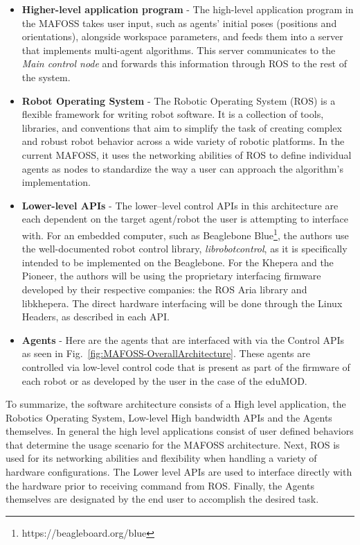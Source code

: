 \begin{itemize}
    \item \textbf{Higher-level application program} - The high-level application program in the MAFOSS takes user input, such as agents' initial poses (positions and orientations), alongside workspace parameters, and feeds them into a server that implements multi-agent algorithms. This server communicates to the \emph{Main control node} and forwards this information through ROS to the rest of the system. 
    \item \textbf{Robot Operating System} - The Robotic Operating System (ROS) is a flexible framework for writing robot software. It is a collection of tools, libraries, and conventions that aim to simplify the task of creating complex and robust robot behavior across a wide variety of robotic platforms. In the current MAFOSS, it uses the networking abilities of ROS to define individual agents as nodes to standardize the way a user can approach the algorithm's implementation.  
    \item \textbf{Lower-level APIs} - The lower--level control APIs in this architecture are each dependent on the target agent/robot the user is attempting to interface with. For an embedded computer, such as Beaglebone Blue\footnote{https://beagleboard.org/blue}, the authors use the well-documented robot control library, \emph{librobotcontrol}, as it is specifically intended to be implemented on the Beaglebone. For the Khepera and the Pioneer, the authors will be using the proprietary interfacing firmware developed by their respective companies: the ROS Aria library and libkhepera. The direct hardware interfacing will be done through the Linux Headers, as described in each API.
    \item \textbf{Agents} - Here are the agents that are interfaced with via the Control APIs as seen in Fig.~\ref{fig:MAFOSS-OverallArchitecture}. These agents are controlled via low-level control code that is present as part of the firmware of each robot or as developed by the user in the case of the eduMOD.
\end{itemize}

To summarize, the software architecture consists of a High level application, the Robotics Operating System, Low-level High bandwidth APIs and the Agents themselves. In general the high level applications consist of user defined behaviors that determine the usage scenario for the MAFOSS architecture. Next, ROS is used for its networking abilities and flexibility when handling a variety of hardware configurations. The Lower level APIs are used to interface directly with the hardware prior to receiving command from ROS. Finally, the Agents themselves are designated by the end user to accomplish the desired task. 


